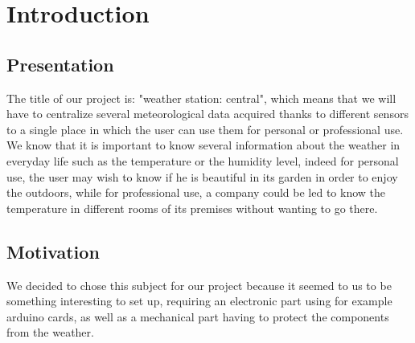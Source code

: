 \documentclass{article}
\newcounter{romancounter} %
\begin{document}

\renewcommand{\contentsname}{Table of Contents} %
\tableofcontents
{}
\newpage

\listoffigures
{}
\listoflistings
{}
\listoftables
{}


\cleardoublepage
{} %

\section{Introduction}

\subsection{Presentation}
The title of our project is: "weather station: central", which means that we will have to centralize several meteorological data acquired thanks to different sensors to a single place in which the user can use them for personal or professional use. We know that it is important to know several information about the weather in everyday life such as the temperature or the humidity level, indeed for personal use, the user may wish to know if he is beautiful in its garden in order to enjoy the outdoors, while for professional use, a company could be led to know the temperature in different rooms of its premises without wanting to go there.

\subsection{Motivation}
We decided to chose this subject for our project because it seemed to us to be something interesting to set up, requiring an electronic part using for example arduino cards, as well as a mechanical part having to protect the components from the weather.





\end{document}
